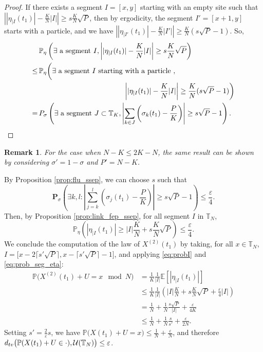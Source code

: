 \documentclass[11pt,a4paper]{article}
\newcommand{\E}{\mathbb{E}}
\newcommand{\T}{\mathbb{T}}
\newcommand{\PP}{\mathbb{P}}
\newcommand{\bP}{\textbf{P}}
\newcommand\entc[1]{\lceil #1 \rceil}
\newtheorem{remark}{Remark}[section]
\newcommand{\eqs}[1]{\begin{equation}#1\end{equation}}
\newcommand{\eq}[2]{\begin{equation}\label{#1}#2\end{equation}}
\begin{document}
\begin{proof}
If there exists a segment $I = [x,y]$ starting with an empty site
such that $\left| |\eta_{|I}(t_1)| - \frac{K}{N} |I| \right| \ge s \frac{K}{N}\sqrt{P}$, then by ergodicity, the segment $I' = [x+1, y]$ starts with a particle, and we have $\left| |\eta_{|I'}(t_1)| - \frac{K}{N} |I'| \right| \ge \frac{K}{N} (s\sqrt{P}-1)$. So, 
\begin{align}
&\,\PP_\eta\left(\exists \hbox{ a segment } I, \left| |\eta_{|I}(t_1)| - \frac{K}{N} |I| \right| \ge s\frac{K}{N} \sqrt{P}\right)
 \nonumber\\
\le &\,\PP_\eta\bigg(\exists \hbox{ a segment } I \hbox{ starting with a particle }, \nonumber\\
& \qquad\qquad\qquad\qquad\qquad\qquad \left| |\eta_{|I}(t_1)| - \frac{K}{N} |I| \right| \ge \frac{K}{N}(s\sqrt{P}-1)\bigg) \nonumber\\
=& \,\bP_\sigma\left(\exists \hbox{ a segment }J \subset \T_K, \left|\sum_{k\in J}\left(\sigma_k(t_1) - \frac{P}{K}\right)\right| \ge s\sqrt{P}-1\right).
 \end{align}

\end{proof}
\begin{remark} \label{rem:sigmaprime}
For the case when $N-K \le 2K-N$, the same result can be shown by considering $\sigma' = 1-\sigma$ and $P' = N-K$. 
\end{remark}
By Proposition \ref{prop:flu_ssep}, we can choose $s$ such that 
\eqs{\bP_\sigma\left(\exists k, l : \left|\sum_{j=k}^{l} \left(\sigma_j(t_1) - \frac{P}{K} \right)  \right|\ge s\sqrt{P} - 1\right) \le \frac{\varepsilon}{4}.} 
Then, by Proposition \ref{prop:link_fep_ssep}, for all segment $I$ in $\T_N$, 
\eq{eq:prob_seg_eta}{\PP_\eta\left(|\eta_{|I}(t_1)| \ge |I|\frac{K}{N} + s\frac{K}{N}\sqrt{P} \right)\le\frac{\varepsilon}{4}.} We conclude the computation of the law of $X^{(2)}(t_1)$ by taking, for all $x \in \T_N$, $I = \big[x-2\entc{s'\sqrt{P}}, x - \entc{s'\sqrt{P}}-1\big]$, and applying \eqref{eq:probI} and \eqref{eq:prob_seg_eta}:
\begin{align}
\PP\big(X^{(2)}(t_1) + U = x\mod N\big) &= \frac{1}{K}\frac{1}{|I|} \E\left[|\eta_{|I}(t_1)|\right] \nonumber\\
&\le \frac{1}{K}\frac{1}{|I|}\left(|I| \frac{K}{N}  + s \frac{K}{N}\sqrt{P} + \frac{\varepsilon}{4} |I| \right)\nonumber\\
&= \frac{1}{N}  + \frac{1}{N} \frac{s \sqrt{P}}{|I|} + \frac{\varepsilon}{4K}\nonumber\\
&\le \frac{1}{N}  + \frac{1}{N} \frac{s}{s'} + \frac{\varepsilon}{2N}. 
\end{align}
Setting $s' = \frac{2}{\varepsilon} s$, we have $\PP\big(X(t_1) + U = x\big) \le \frac{1}{N} + \frac{\varepsilon}{N}$, and therefore $d_{\textsc{tv}}\big(\PP(X(t_1) + U \in \cdot), \mathcal{U}(\T_N)\big) \le \varepsilon$.
\end{document}
